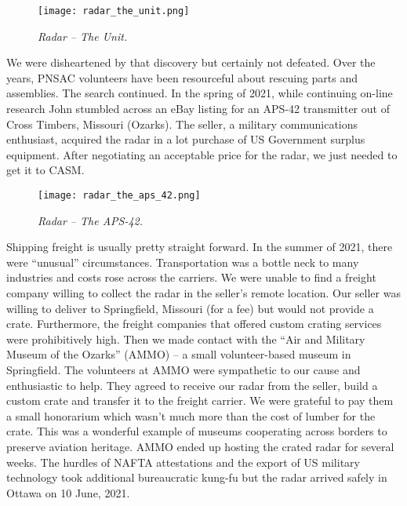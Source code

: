 \begin{figure}[H]
   \vspace{2em}
   \centering
   \texttt{[image: radar\_the\_unit.png]}
   \caption*{\small \em Radar -- The Unit.}
   \label{fig:img1}
\end{figure}

We were disheartened by that discovery but certainly not defeated. Over the years, PNSAC volunteers have been resourceful about rescuing parts and assemblies. The search continued. In the spring of 2021, while continuing on-line research John stumbled across an eBay listing for an APS-42 transmitter out of Cross Timbers, Missouri (Ozarks). The seller, a military communications enthusiast, acquired the radar in a lot purchase of US Government surplus equipment. After negotiating an acceptable price for the radar, we just needed to get it to CASM.

\begin{figure}[H]
    \vspace{2em}
    \centering
    \texttt{[image: radar\_the\_aps\_42.png]}
    \caption*{\small \em Radar -- The APS-42.}
    \label{fig:img2}
 \end{figure}
 
Shipping freight is usually pretty straight forward. In the summer of 2021, there were “unusual” circumstances. Transportation was a bottle neck to many industries and costs rose across the carriers. We were unable to find a freight company willing to collect the radar in the seller’s remote location. Our seller was willing to deliver to Springfield, Missouri (for a fee) but would not provide a crate. Furthermore, the freight companies that offered custom crating services were prohibitively high. Then we made contact with the “Air and Military Museum of the Ozarks” (AMMO) – a small volunteer-based museum in Springfield. The volunteers at AMMO were sympathetic to our cause and enthusiastic to help. They agreed to receive our radar from the seller, build a custom crate and transfer it to the freight carrier. We were grateful to pay them a small honorarium which wasn’t much more than the cost of lumber for the crate. This was a wonderful example of museums cooperating across borders to preserve aviation heritage. AMMO ended up hosting the crated radar for several weeks. The hurdles of NAFTA attestations and the export of US military technology took additional bureaucratic kung-fu but the radar arrived safely in Ottawa on 10 June, 2021.

